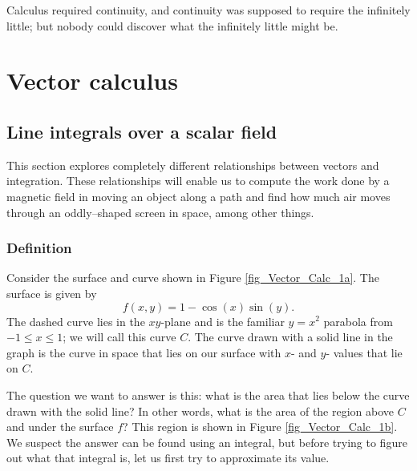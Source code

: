 \begin{savequote}[75mm]
Calculus required continuity, and continuity was supposed to require the infinitely little; but nobody could discover what the infinitely little might be.      
\end{savequote}

\chapter{Vector calculus}
\graphicspath{{figures/Vector_Calc/}}

\section{Line integrals over a scalar field}\label{sec:line_int_intro}
This section explores completely different relationships between vectors and integration. These relationships will enable us to compute the work done by a magnetic field in moving an object along a path and find how much air moves through an oddly--shaped screen in space, among other things. 

\subsection{Definition}
Consider the surface and curve shown in Figure \ref{fig_Vector_Calc_1a}. The surface is given by $$f(x,y)=1-\cos(x)\sin(y).$$
The dashed curve lies in the $xy$-plane and is the familiar $y=x^2$ parabola from $-1\leq x\leq1$; we will call this curve $C$. The curve drawn with a solid line in the graph is the curve in space that lies on our surface with $x$- and $y$- values that lie on $C$. 

The question we want to answer is this: what is the area that lies below the curve drawn with the solid line? In other words, what is the area of the region above $C$ and under the surface $f$? This region is shown in Figure \ref{fig_Vector_Calc_1b}. We suspect the answer can be found using an integral, but before trying to figure out what that integral is, let us first try to approximate its value. 


